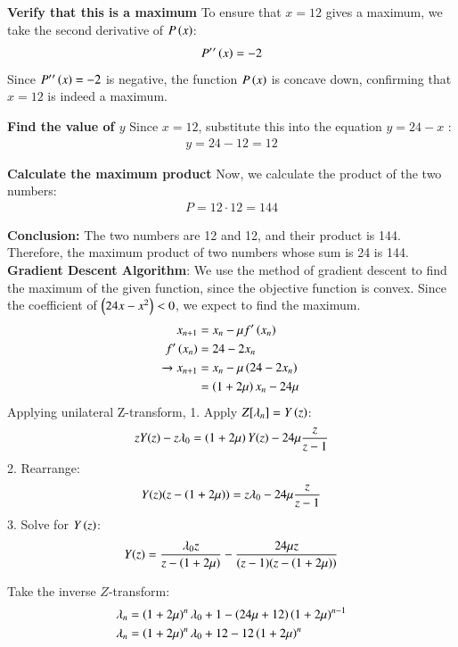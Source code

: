 \documentclass[journal]{IEEEtran}
\begin{document}
\textbf{Verify that this is a maximum}  
To ensure that $ x = 12 $ gives a maximum, we take the second derivative of $ P\left(x\right) $:
\begin{align}
    P{^\prime}{^\prime}\left(x\right) = -2
\end{align}
Since $ P{^\prime}{^\prime}\left(x\right) = -2 $ is negative, the function $ P\left(x\right) $ is concave down, confirming that $ x = 12 $ is indeed a maximum.

\textbf{Find the value of $ y $}  
Since $ x = 12 $, substitute this into the equation $ y = 24 - x $ :
\begin{align}
    y = 24 - 12 = 12
\end{align}

\textbf{Calculate the maximum product}  
Now, we calculate the product of the two numbers:
\begin{align}
    P = 12 \cdot 12 = 144
\end{align}

\textbf{Conclusion:} The two numbers are 12 and 12, and their product is 144. Therefore, the maximum product of two numbers whose sum is 24 is 144. \\

\textbf{Gradient Descent Algorithm}:
We use the method of gradient descent to find the maximum of the given function, since the objective function is convex.
Since the coefficient of $\left(24x-x^2\right) < 0$, we expect to find the maximum.
\begin{align}
    x_{n+1} &= x_n - \mu f^{\prime}\left(x_n\right)\\
    f^{\prime}\left(x_n\right) &= 24 - 2x_n\\
    \xrightarrow{} x_{n+1} &= x_n - \mu\left(24 - 2x_n\right) \\
    &= \left(1+2\mu\right)x_n -24\mu
\end{align}
Applying unilateral Z-transform,
1. Apply $ Z[\lambda_n] = Y\left(z\right) $:
   \begin{align}
   zY(z) - z\lambda_0 = \left(1+2\mu\right)Y(z) - 24\mu \frac{z}{z-1}
   \end{align}
2. Rearrange:
   \begin{align}
   Y(z)(z - \left(1+2\mu\right)) = z\lambda_0 - 24\mu \frac{z}{z-1}
   \end{align}
3. Solve for $ Y\left(z\right) $:
   \begin{align}
   Y(z) = \frac{\lambda_0 z}{z-\left(1+2\mu\right)} - \frac{24\mu z}{(z-1)(z-\left(1+2\mu\right))}
   \end{align}

Take the inverse $ Z $-transform:
\begin{align}
\lambda_n &= \left(1+2\mu\right)^n \lambda_0 + 1 - \left(24\mu +12\right)\left(1+2\mu\right)^{n-1} \\
\lambda_n &= \left(1+2\mu\right)^n \lambda_0 + 12 - 12\left(1+2\mu\right)^n
\end{align}
\end{document}
